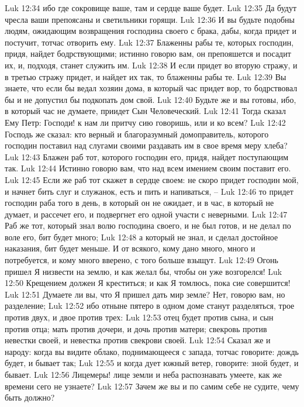 Luk 12:34  ибо где сокровище ваше, там и сердце ваше будет.
Luk 12:35  Да будут чресла ваши препоясаны и светильники горящи.
Luk 12:36  И вы будьте подобны людям, ожидающим возвращения господина своего с брака, дабы, когда придет и постучит, тотчас отворить ему.
Luk 12:37  Блаженны рабы те, которых господин, придя, найдет бодрствующими; истинно говорю вам, он препояшется и посадит их, и, подходя, станет служить им.
Luk 12:38  И если придет во вторую стражу, и в третью стражу придет, и найдет их так, то блаженны рабы те.
Luk 12:39  Вы знаете, что если бы ведал хозяин дома, в который час придет вор, то бодрствовал бы и не допустил бы подкопать дом свой.
Luk 12:40  Будьте же и вы готовы, ибо, в который час не думаете, приидет Сын Человеческий.
Luk 12:41  Тогда сказал Ему Петр: Господи! к нам ли притчу сию говоришь, или и ко всем?
Luk 12:42  Господь же сказал: кто верный и благоразумный домоправитель, которого господин поставил над слугами своими раздавать им в свое время меру хлеба?
Luk 12:43  Блажен раб тот, которого господин его, придя, найдет поступающим так.
Luk 12:44  Истинно говорю вам, что над всем имением своим поставит его.
Luk 12:45  Если же раб тот скажет в сердце своем: не скоро придет господин мой, и начнет бить слуг и служанок, есть и пить и напиваться, --
Luk 12:46  то придет господин раба того в день, в который он не ожидает, и в час, в который не думает, и рассечет его, и подвергнет его одной участи с неверными.
Luk 12:47  Раб же тот, который знал волю господина своего, и не был готов, и не делал по воле его, бит будет много;
Luk 12:48  а который не знал, и сделал достойное наказания, бит будет меньше. И от всякого, кому дано много, много и потребуется, и кому много вверено, с того больше взыщут.
Luk 12:49  Огонь пришел Я низвести на землю, и как желал бы, чтобы он уже возгорелся!
Luk 12:50  Крещением должен Я креститься; и как Я томлюсь, пока сие совершится!
Luk 12:51  Думаете ли вы, что Я пришел дать мир земле? Нет, говорю вам, но разделение;
Luk 12:52  ибо отныне пятеро в одном доме станут разделяться, трое против двух, и двое против трех:
Luk 12:53  отец будет против сына, и сын против отца; мать против дочери, и дочь против матери; свекровь против невестки своей, и невестка против свекрови своей.
Luk 12:54  Сказал же и народу: когда вы видите облако, поднимающееся с запада, тотчас говорите: дождь будет, и бывает так;
Luk 12:55  и когда дует южный ветер, говорите: зной будет, и бывает.
Luk 12:56  Лицемеры! лице земли и неба распознавать умеете, как же времени сего не узнаете?
Luk 12:57  Зачем же вы и по самим себе не судите, чему быть должно?
